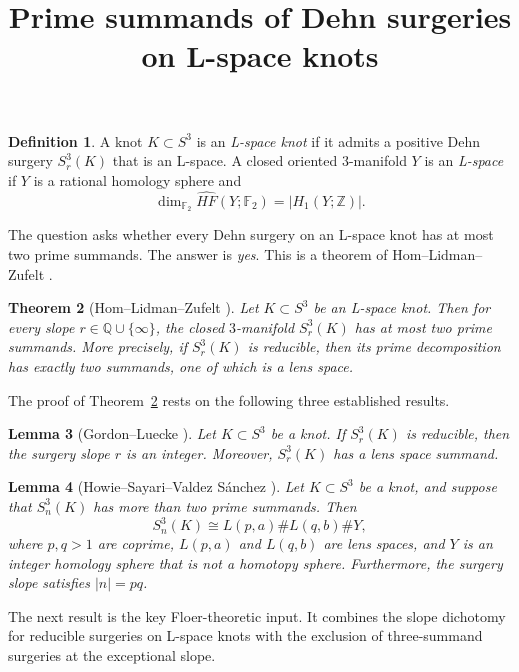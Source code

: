 \documentclass[12pt]{article}
\title{Prime summands of Dehn surgeries on L-space knots}
\author{}
\date{}
\newtheorem{theorem}{Theorem}
\newtheorem{lemma}[theorem]{Lemma}
\theoremstyle{definition}
\newtheorem{definition}[theorem]{Definition}
\newcommand{\HFhat}{\widehat{HF}}
\begin{document}
\maketitle

\begin{definition}
A knot \(K\subset S^3\) is an \emph{L-space knot} if it admits a positive Dehn surgery
\(S^3_r(K)\) that is an L-space.  A closed oriented \(3\)-manifold \(Y\) is an
\emph{L-space} if \(Y\) is a rational homology sphere and
\[
\dim_{\mathbb F_2}\HFhat(Y;\mathbb F_2)=|H_1(Y;\mathbb Z)|.
\]
\end{definition}

The question asks whether every Dehn surgery on an L-space knot has at most two
prime summands.  The answer is \emph{yes}.  This is a theorem of
Hom--Lidman--Zufelt \cite{HLZ}.

\begin{theorem}[Hom--Lidman--Zufelt \cite{HLZ}]
\label{thm:main}
Let \(K\subset S^3\) be an L-space knot.  Then for every slope \(r\in\mathbb Q\cup\{\infty\}\),
the closed \(3\)-manifold \(S^3_r(K)\) has at most two prime summands.
More precisely, if \(S^3_r(K)\) is reducible, then its prime decomposition has exactly
two summands, one of which is a lens space.
\end{theorem}

The proof of Theorem~\ref{thm:main} rests on the following three established
results.

\begin{lemma}[Gordon--Luecke \cite{GL}]
\label{lem:GL}
Let \(K\subset S^3\) be a knot.  If \(S^3_r(K)\) is reducible, then the surgery
slope \(r\) is an integer.  Moreover, \(S^3_r(K)\) has a lens space summand.
\end{lemma}

\begin{lemma}[Howie--Sayari--Valdez S\'anchez \cite{HSV}]
\label{lem:three}
Let \(K\subset S^3\) be a knot, and suppose that \(S^3_n(K)\) has more than two
prime summands.  Then
\[
S^3_n(K)\cong L(p,a)\#L(q,b)\#Y,
\]
where \(p,q>1\) are coprime, \(L(p,a)\) and \(L(q,b)\) are lens spaces, and
\(Y\) is an integer homology sphere that is not a homotopy sphere.  Furthermore,
the surgery slope satisfies \(|n|=pq\).
\end{lemma}

The next result is the key Floer-theoretic input.  It combines the slope
dichotomy for reducible surgeries on L-space knots with the exclusion of
three-summand surgeries at the exceptional slope.
\end{document}
